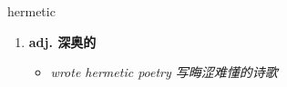 
\begin{frame}
{\huge hermetic}
\begin{center}
\begin{enumerate}\Large
  \item \textbf{adj. 深奥的}
  \begin{itemize}
    \item \em{\Large{wrote hermetic poetry 写晦涩难懂的诗歌}}
  \end{itemize}
\end{enumerate}
\end{center}
\end{frame}

